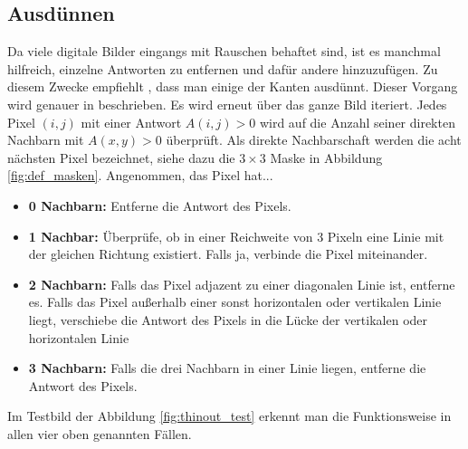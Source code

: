 \documentclass[a4paper, 11pt]{report}
\theoremstyle{definition}
\begin{document}
		\subsection{Ausdünnen}\label{ssec:thinout}
			Da viele digitale Bilder eingangs mit Rauschen behaftet sind, ist es manchmal hilfreich, einzelne Antworten zu entfernen und dafür andere hinzuzufügen. Zu diesem Zwecke empfiehlt \cite{SUSAN}, dass man einige der Kanten ausdünnt. Dieser Vorgang wird genauer in \cite{thinout} beschrieben.
			Es wird erneut über das ganze Bild iteriert. Jedes Pixel $(i,j)$ mit einer Antwort $A(i,j) > 0$ wird auf die Anzahl seiner direkten Nachbarn mit $A(x,y) > 0$ überprüft. Als direkte Nachbarschaft werden die acht nächsten Pixel bezeichnet, siehe dazu die $3\times 3$ Maske in Abbildung \ref{fig:def_masken}. Angenommen, das Pixel hat...
			\begin{itemize}
				\item \textbf{0 Nachbarn:}
					Entferne die Antwort des Pixels.
				\item \textbf{1 Nachbar:}
					Überprüfe, ob in einer Reichweite von 3 Pixeln eine Linie mit der gleichen Richtung existiert. Falls ja, verbinde die Pixel miteinander.
				\item \textbf{2 Nachbarn:}
					Falls das Pixel adjazent zu einer diagonalen Linie ist, entferne es.
					Falls das Pixel außerhalb einer sonst horizontalen oder vertikalen Linie liegt, verschiebe die Antwort des Pixels in die Lücke der vertikalen oder horizontalen Linie
				\item \textbf{3 Nachbarn:}
					Falls die drei Nachbarn in einer Linie liegen, entferne die Antwort des Pixels.
			\end{itemize}

			Im Testbild der Abbildung \ref{fig:thinout_test} erkennt man die Funktionsweise in allen vier oben genannten Fällen.
\end{document}
